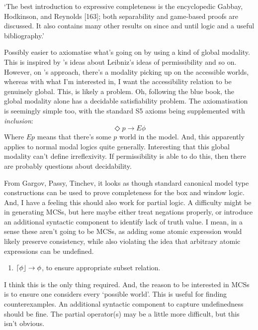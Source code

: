 \documentclass[10pt]{article}
\begin{document}
`The best introduction to expressive completeness is the encyclopedic Gabbay, Hodkinson, and Reynolds [163]; both separability and game-based proofs are discussed. It also contains many other results on since and until logic and a useful bibliography.'

Possibly easier to axiomatise what's going on by using a kind of global modality.
This is inspired by \citeauthor{van-Benthem:1979aa}'s ideas about Leibniz's ideas of permissibility and so on.
However, on \citeauthor{van-Benthem:1979aa}'s approach, there's a modality picking up on the accessible worlds, whereas with what I'm interested in, I want the accessibility relation to be genuinely global.
This, is likely a problem.
Oh, following the blue book, the global modality alone has a decidable satisfiability problem.
The axiomatisation is seemingly simple too, with the standard S5 axioms being supplemented with \emph{inclusion}:
\[\Diamond p \rightarrow E\phi\]
Where \(Ep\) means that there's some \(p\) world in the model.
And, this apparently applies to normal modal logics quite generally.
Interesting that this global modality can't define irreflexivity.
If permissibility is able to do this, then there are probably questions about decidability.

From Gargov, Passy, Tinchev, it looks as though standard canonical model type constructions can be used to prove completeness for the box and window logic.
And, I have a feeling this should also work for partial logic.
A difficulty might be in generating MCSs, but here maybe either treat negations properly, or introduce an additional syntactic component to identify lack of truth value.
I mean, in a sense these aren't going to be MCSs, as adding some atomic expression would likely preserve consistency, while also violating the idea that arbitrary atomic expressions can be undefined.

\begin{enumerate}
\item \(\mathord{\lceil{\phi}\rfloor} \rightarrow \phi\), to ensure appropriate subset relation.
\end{enumerate}

I think this is the only thing required.
And, the reason to be interested in MCSs is to ensure one considers every `possible world'.
This is useful for finding counterexamples.
An additional syntactic component to capture undefinedness should be fine.
The partial operator(s) may be a little more difficult, but this isn't obvious.
\end{document}
